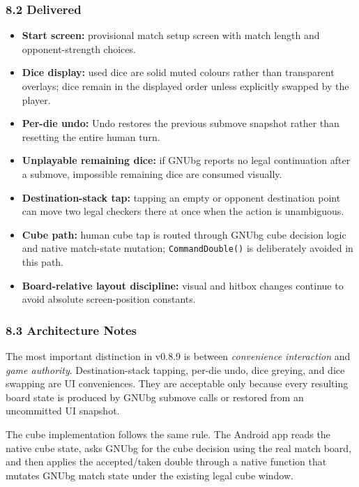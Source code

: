 \documentclass[11pt,a4paper]{article}
\providecommand{\tightlist}{\setlength{\itemsep}{2pt}\setlength{\parskip}{0pt}}
\begin{document}
\subsubsection{8.2 Delivered}

\begin{itemize}
\tightlist
\item
  \textbf{Start screen:} provisional match setup screen with match length and opponent-strength choices.
\item
  \textbf{Dice display:} used dice are solid muted colours rather than transparent overlays; dice remain in the displayed order unless explicitly swapped by the player.
\item
  \textbf{Per-die undo:} Undo restores the previous submove snapshot rather than resetting the entire human turn.
\item
  \textbf{Unplayable remaining dice:} if GNUbg reports no legal continuation after a submove, impossible remaining dice are consumed visually.
\item
  \textbf{Destination-stack tap:} tapping an empty or opponent destination point can move two legal checkers there at once when the action is unambiguous.
\item
  \textbf{Cube path:} human cube tap is routed through GNUbg cube decision logic and native match-state mutation; \texttt{CommandDouble()} is deliberately avoided in this path.
\item
  \textbf{Board-relative layout discipline:} visual and hitbox changes continue to avoid absolute screen-position constants.
\end{itemize}

\subsubsection{8.3 Architecture Notes}

The most important distinction in v0.8.9 is between \emph{convenience interaction} and \emph{game authority}. Destination-stack tapping, per-die undo, dice greying, and dice swapping are UI conveniences. They are acceptable only because every resulting board state is produced by GNUbg submove calls or restored from an uncommitted UI snapshot.

The cube implementation follows the same rule. The Android app reads the native cube state, asks GNUbg for the cube decision using the real match board, and then applies the accepted/taken double through a native function that mutates GNUbg match state under the existing legal cube window.
\end{document}
